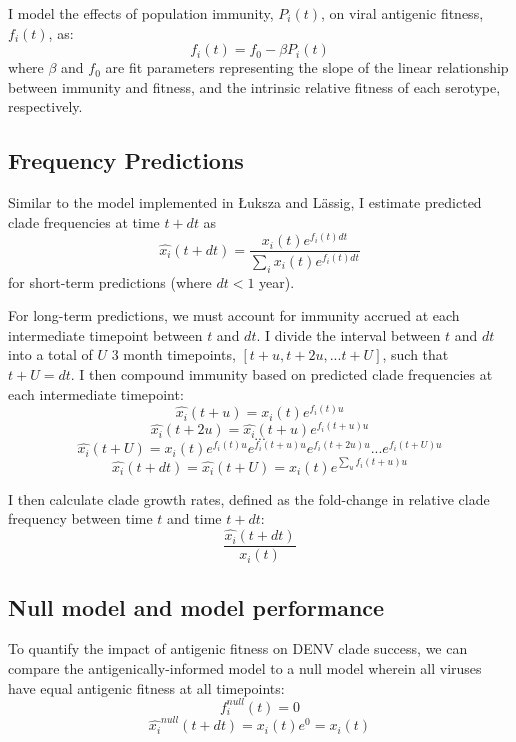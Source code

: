 I model the effects of population immunity, $P_i(t)$, on viral antigenic fitness, $f_i(t)$, as:
\begin{equation}
  \label{eq_fitness}
f_i(t) = f_0-\beta P_i(t)
\end{equation}
where $\beta$ and $f_0$ are fit parameters representing the slope of the linear relationship between immunity and fitness, and the intrinsic relative fitness of each serotype, respectively.

\subsection*{Frequency Predictions}
Similar to the model implemented in {\L}uksza and L\"assig, I estimate predicted clade frequencies at time $t + dt$ as
\begin{equation}
  \label{eq_predict_frequency}
\hat{x_i}(t+dt) = \frac{x_i(t) e^{f_i(t) dt}}{\sum_{i}x_i(t) e^{f_i(t) dt}}
\end{equation}
for short-term predictions (where $dt < 1$ year).

For long-term predictions, we must account for immunity accrued at each intermediate timepoint between $t$ and $dt$.
I divide the interval between $t$ and $dt$ into a total of $U$ 3 month timepoints, $[t+u, t+2u, ... t+U]$, such that $t+U=dt$.
I then compound immunity based on predicted clade frequencies at each intermediate timepoint:
\begin{equation}
\hat{x_i}(t+u) = x_i(t)e^{f_i(t) u}
\end{equation}
\begin{equation}
\hat{x_i}(t+2u) = \hat{x_i}(t+u) e^{f_i(t+u)u}
\end{equation}
$$...$$
\begin{equation}
\hat{x_i}(t+U) = x_i(t) e^{f_i(t)u} e^{f_i(t+u)u} e^{f_i(t+2u)u} ... e^{f_i(t+U)u}
\end{equation}
\begin{equation}
  \label{eq_compounding_immunity}
\hat{x_i}(t+dt) = \hat{x_i}(t+U) = x_i(t) e^{\sum_{u}f_i(t+u)u}
\end{equation}

I then calculate clade growth rates, defined as the fold-change in relative clade frequency between time $t$ and time $t+dt$:
\begin{equation}
  \label{eq_growth_rate}
\frac{\hat{x_i}(t+dt)}{x_i(t)}
\end{equation}

\subsection*{Null model and model performance}
To quantify the impact of antigenic fitness on DENV clade success, we can compare the antigenically-informed model to a null model wherein all viruses have equal antigenic fitness at all timepoints:
\begin{equation}
  \label{eq_null}
f_i^{null}(t) = 0
\end{equation}
\begin{equation}
\hat{x_i}^{null}(t+dt) = x_i(t) e^0 = x_i(t)
\end{equation}

